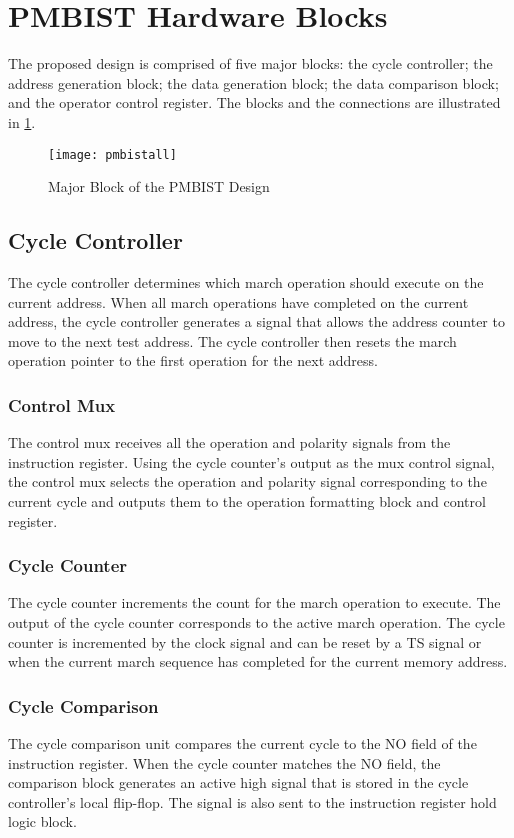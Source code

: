 \section{PMBIST Hardware Blocks}
\label{sect:bg-blocks}
The proposed design is comprised of five major blocks: the cycle controller; the address generation block; the data generation block; the data comparison block; and the operator control register.  The blocks and the connections are illustrated in \ref{fig:pmbistall}.

\begin{figure}[h]
  \centering
  \texttt{[image: pmbistall]}
  \caption{Major Block of the PMBIST Design}
  \label{fig:pmbistall}
\end{figure}

\subsection{Cycle Controller}
The cycle controller determines which march operation should execute on the current address.  When all march operations have completed on the current address, the cycle controller generates a signal that allows the address counter to move to the next test address.  The cycle controller then resets the march operation pointer to the first operation for the next address.   

\subsubsection{Control Mux}
The control mux receives all the operation and polarity signals from the instruction register.  Using the cycle counter's output as the mux control signal, the control mux selects the operation and polarity signal corresponding to the current cycle and outputs them to the operation formatting block and control register.  

\subsubsection{Cycle Counter}
The cycle counter increments the count for the march operation to execute.  The output of the cycle counter corresponds to the active march operation.  The cycle counter is incremented by the clock signal and can be reset by a TS signal or when the current march sequence has completed for the current memory address. 

\subsubsection{Cycle Comparison}
The cycle comparison unit compares the current cycle to the NO field of the instruction register.  When the cycle counter matches the NO field, the comparison block generates an active high signal that is stored in the cycle controller's local flip-flop.  The signal is also sent to the instruction register hold logic block.  

